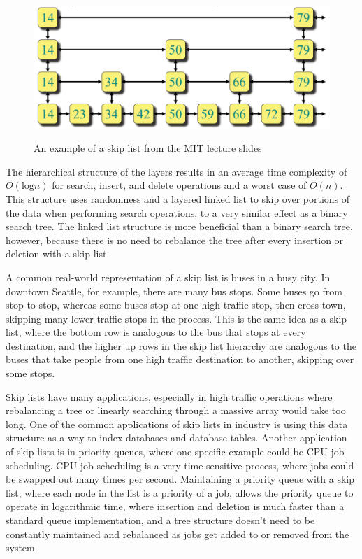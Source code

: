 \documentclass{article}
\begin{document}
\begin{figure}[h]
    \centering
    \includegraphics[width=\textwidth,keepaspectratio]{Images/SkipList_MIT.PNG}
    \label{fig:my_label}
    \caption{An example of a skip list from the MIT lecture slides}
\end{figure}

The hierarchical structure of the layers results in an average time complexity of $O(\text{log} n)$ for search, insert, and delete operations and a worst case of $O(n)$. This structure uses randomness and a layered linked list to skip over portions of the data when performing search operations, to a very similar effect as a binary search tree. The linked list structure is more beneficial than a binary search tree, however, because there is no need to rebalance the tree after every insertion or deletion with a skip list.

A common real-world representation of a skip list is buses in a busy city. In downtown Seattle, for example, there are many bus stops. Some buses go from stop to stop, whereas some buses stop at one high traffic stop, then cross town, skipping many lower traffic stops in the process. This is the same idea as a skip list, where the bottom row is analogous to the bus that stops at every destination, and the higher up rows in the skip list hierarchy are analogous to the buses that take people from one high traffic destination to another, skipping over some stops. 

Skip lists have many applications, especially in high traffic operations where rebalancing a tree or linearly searching through a massive array would take too long. One of the common applications of skip lists in industry is using this data structure as a way to index databases and database tables. Another application of skip lists is in priority queues, where one specific example could be CPU job scheduling. CPU job scheduling is a very time-sensitive process, where jobs could be swapped out many times per second. Maintaining a priority queue with a skip list, where each node in the list is a priority of a job, allows the priority queue to operate in logarithmic time, where insertion and deletion is much faster than a standard queue implementation, and a tree structure doesn’t need to be constantly maintained and rebalanced as jobs get added to or removed from the system.



\pagebreak
\end{document}
